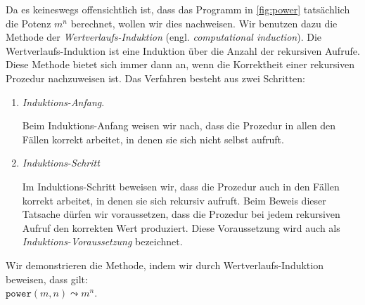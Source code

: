 Da es keineswegs offensichtlich ist, dass das Programm in \ref{fig:power} 
tats\"achlich die Potenz $m^n$ berechnet,  wollen wir dies nachweisen.  Wir benutzen dazu
die Methode der \emph{Wertverlaufs-Induktion} (engl. \emph{computational induction}).
Die Wertverlaufs-Induktion ist eine Induktion \"uber die Anzahl der rekursiven Aufrufe.
Diese Methode bietet sich immer dann an, wenn die Korrektheit einer rekursiven Prozedur
nachzuweisen ist. Das Verfahren besteht aus zwei Schritten:
\begin{enumerate}
\item \emph{Induktions-Anfang}.

      Beim Induktions-Anfang weisen wir nach, dass die Prozedur in allen den F\"allen korrekt arbeitet,
      in denen sie sich nicht selbst aufruft.  
\item \emph{Induktions-Schritt}

      Im Induktions-Schritt beweisen wir, dass die Prozedur auch in den F\"allen korrekt
      arbeitet, in denen sie sich rekursiv aufruft.   Beim Beweis dieser Tatsache d\"urfen
      wir voraussetzen, dass die Prozedur bei jedem rekursiven Aufruf den korrekten Wert
      produziert. Diese Voraussetzung wird auch als \emph{Induktions-Voraussetzung} bezeichnet.
\end{enumerate}
Wir demonstrieren die Methode, indem wir durch Wertverlaufs-Induktion beweisen, dass 
gilt: 
\\[0.1cm]
\hspace*{1.3cm} $\mathtt{power}(m,n) \leadsto m^n$.
